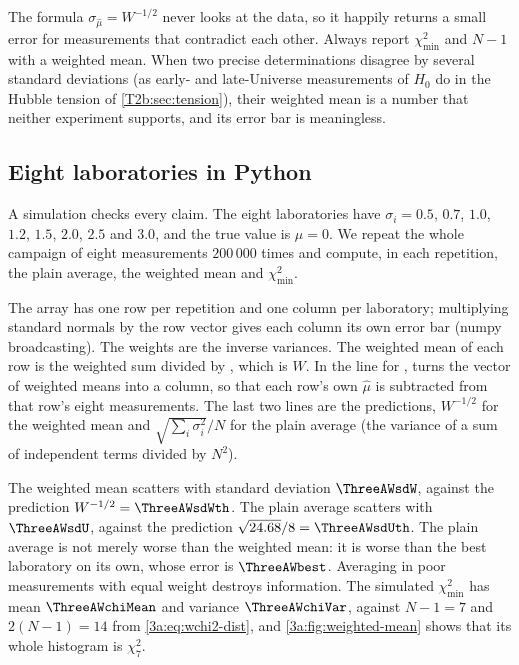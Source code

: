 \begin{pitfall}
The formula $\sigma_{\hat\mu}=W^{-1/2}$ never looks at the data, so it
happily returns a small error for measurements that contradict each other.
Always report $\chi^2_{\min}$ and $N-1$ with a weighted mean. When two
precise determinations disagree by several standard deviations (as early-
and late-Universe measurements of $H_0$ do in the Hubble tension of
\cref{T2b:sec:tension}), their weighted mean is a number
that neither experiment supports, and its error bar is meaningless.
\end{pitfall}

\subsection{Eight laboratories in Python}
\label{3a:sec:weighted-python}

A simulation checks every claim. The eight laboratories have
$\sigma_i=0.5$, $0.7$, $1.0$, $1.2$, $1.5$, $2.0$, $2.5$ and $3.0$, and the true value is
$\mu=0$. We repeat the whole campaign of eight measurements $200\,000$ times
and compute, in each repetition, the plain average, the weighted mean and
$\chi^2_{\min}$.


The array  has one row per repetition and one column per
laboratory; multiplying standard normals by the row vector 
gives each column its own error bar (numpy broadcasting). The weights
 are the inverse variances. The weighted mean of each row is the
weighted sum divided by , which is $W$. In the line for
,  turns the vector of weighted means into
a column, so that each row's own $\hat\mu$ is subtracted from that row's
eight measurements. The last two lines are the predictions,
$W^{-1/2}$ for the weighted mean and $\sqrt{\sum_i\sigma_i^2}/N$ for the
plain average (the variance of a sum of independent terms divided by
$N^2$).

The weighted mean scatters with standard deviation $\ThreeAWsdW$, against
the prediction $W^{-1/2}=\ThreeAWsdWth$. The plain average scatters with
$\ThreeAWsdU$, against the prediction $\sqrt{24.68}/8=\ThreeAWsdUth$. The
plain average is not merely worse than the weighted mean: it is worse than
the best laboratory on its own, whose error is $\ThreeAWbest$. Averaging in
poor measurements with equal weight destroys information. The simulated
$\chi^2_{\min}$ has mean $\ThreeAWchiMean$ and variance $\ThreeAWchiVar$,
against $N-1=7$ and $2(N-1)=14$ from \eqref{3a:eq:wchi2-dist}, and
\cref{3a:fig:weighted-mean} shows that its whole histogram is $\chi^2_7$.

